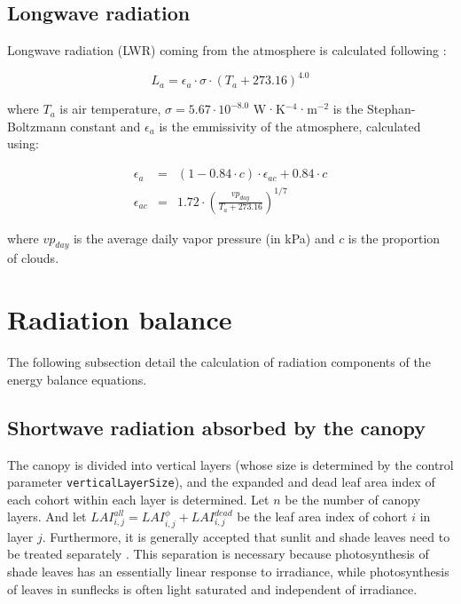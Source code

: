 \documentclass[]{book}
\begin{document}
\section{Longwave radiation}\label{longwave-radiation}

Longwave radiation (LWR) coming from the atmosphere is calculated
following \citet{Campbell1998}:

\begin{equation}
L_{a} = \epsilon_{a} \cdot \sigma \cdot (T_{a} + 273.16)^{4.0}
\end{equation}

where \(T_{a}\) is air temperature, \(\sigma = 5.67 \cdot 10^{-8.0}\)
W·K\(^{-4}\)·m\(^{-2}\) is the Stephan-Boltzmann constant and
\(\epsilon_{a}\) is the emmissivity of the atmosphere, calculated using:

\begin{eqnarray}
\epsilon_{a} &=& (1 - 0.84 \cdot c) \cdot \epsilon_{ac} + 0.84 \cdot c \\
\epsilon_{ac} &=& 1.72 \cdot \left(\frac{vp_{day}}{T_{a} + 273.16} \right)^{1/7}
\end{eqnarray}

where \(vp_{day}\) is the average daily vapor pressure (in kPa) and
\(c\) is the proportion of clouds.

\chapter{Radiation balance}\label{radiation-balance}

The following subsection detail the calculation of radiation components
of the energy balance equations.

\section{Shortwave radiation absorbed by the
canopy}\label{shortwave-radiation-absorbed-by-the-canopy}

The canopy is divided into vertical layers (whose size is determined by
the control parameter \texttt{verticalLayerSize}), and the expanded and
dead leaf area index of each cohort within each layer is determined. Let
\(n\) be the number of canopy layers. And let
\(LAI_{i,j}^{all} = LAI_{i,j}^{\phi}+LAI_{i,j}^{dead}\) be the leaf area
index of cohort \(i\) in layer \(j\). Furthermore, it is generally
accepted that sunlit and shade leaves need to be treated separately
\citep{DePury1997}. This separation is necessary because photosynthesis
of shade leaves has an essentially linear response to irradiance, while
photosynthesis of leaves in sunflecks is often light saturated and
independent of irradiance.
\end{document}
